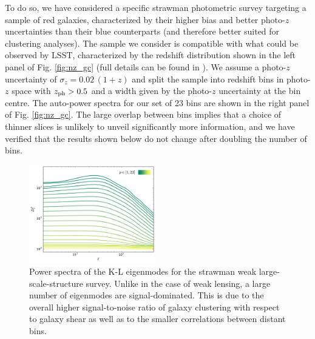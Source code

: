 \documentclass[twocolumn,amsfont,amssymb,amsmath, showpacs,balancelastpage, nofootinbib]{revtex4-1}
\begin{document}
    To do so, we have considered a specific strawman photometric survey targeting a sample of red galaxies, characterized by their higher bias and better photo-$z$ uncertainties than their blue counterparts (and therefore better suited for clustering analyses). The sample we consider is compatible with what could be observed by LSST, characterized by the redshift distribution shown in the left panel of Fig. \ref{fig:nz_gc} (full details can be found in \cite{2015ApJ...814..145A}). We assume a photo-$z$ uncertainty of $\sigma_z=0.02\,(1+z)$ and split the sample into redshift bins in photo-$z$ space with $z_{\rm ph}>0.5$ and a width given by the photo-$z$ uncertainty at the bin centre. The auto-power spectra for our set of 23 bins are shown in the right panel of Fig. \ref{fig:nz_gc}. The large overlap between bins implies that a choice of thinner slices is unlikely to unveil significantly more information, and we have verified that the results shown below do not change after doubling the number of bins. 
    \begin{figure}
      \centering
      \includegraphics[width=0.49\textwidth]{Figs/d_p_gc}
      \caption{Power spectra of the K-L eigenmodes for the strawman weak large-scale-structure survey. Unlike in the case of weak lensing, a large number of eigenmodes are signal-dominated. This is due to the overall higher signal-to-noise ratio of galaxy clustering with respect to galaxy shear as well as to the smaller correlations between distant bins.}\label{fig:dp_gc}
    \end{figure}
\end{document}
